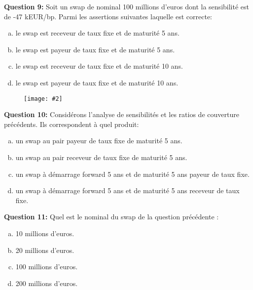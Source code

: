 \documentclass{article}
\newcommand{\FIG}[2]{\texttt{[image: \#2]}}
\newcommand{\indentitem}{\setlength\itemindent{25pt}}
\begin{document}
\textbf{Question 9:}
Soit un swap de nominal 100 millions d’euros dont la sensibilité est de -47 kEUR/bp. Parmi les assertions suivantes laquelle est correcte:
\begin{enumerate}[a)]
\indentitem \item le swap est receveur de taux fixe et de maturité 5 ans.
\indentitem \item le swap est payeur de taux fixe et de maturité 5 ans.
\indentitem \item le swap est receveur de taux fixe et de maturité 10 ans.
\indentitem \item le swap est payeur de taux fixe et de maturité 10 ans.
\end{enumerate}

\begin{figure}[H]
\FIG{15cm}{figures/hedgeratio3.png}
\end{figure}

\textbf{Question 10:}
Considérons l'analyse de sensibilités et les ratios de couverture précédents. Ils correspondent à quel produit:
\begin{enumerate}[a)]
\indentitem \item un swap au pair payeur de taux fixe de maturité 5 ans.
\indentitem \item un swap au pair receveur de taux fixe de maturité 5 ans.
\indentitem \item un swap à démarrage forward 5 ans et de maturité 5 ans payeur de taux fixe.
\indentitem \item un swap à démarrage forward 5 ans et de maturité 5 ans receveur de taux fixe.
\end{enumerate}


\textbf{Question 11:}
Quel est le nominal du swap de la question précédente :
\begin{enumerate}[a)]
\indentitem \item 10 millions d’euros.
\indentitem \item 20 millions d’euros.
\indentitem \item 100 millions d’euros.
\indentitem \item 200 millions d’euros.
\end{enumerate}
\end{document}
